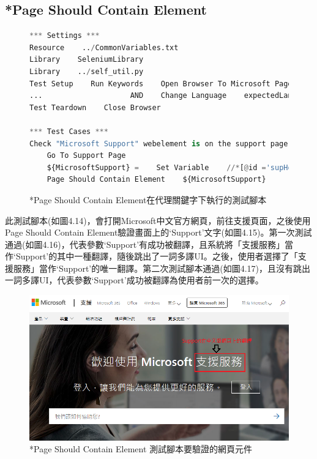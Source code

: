 \subsection{*Page Should Contain Element}
\begin{figure}[H]
\begin{lstlisting}[language={python}]
*** Settings ***
Resource    ../CommonVariables.txt
Library    SeleniumLibrary
Library    ../self_util.py
Test Setup    Run Keywords    Open Browser To Microsoft Page
...                    AND    Change Language    expectedLanguage=${language}
Test Teardown    Close Browser

*** Test Cases ***
Check "Microsoft Support" webelement is on the support page
    Go To Support Page
    ${MicrosoftSupport} =    Set Variable    //*[@id ='supHomeAndLandingPageHeaderContainer']//*[contains(text(), 'Support')]
    Page Should Contain Element    ${MicrosoftSupport}
\end{lstlisting}
\caption{*Page Should Contain Element在代理關鍵字下執行的測試腳本}
\end{figure}
此測試腳本(如圖4.14)，會打開Microsoft中文官方網頁，前往支援頁面，之後使用Page Should Contain Element驗證畫面上的‘Support’文字(如圖4.15)。第一次測試通過(如圖4.16)，代表參數‘Support’有成功被翻譯，且系統將「支援服務」當作‘Support’的其中一種翻譯，隨後跳出了一詞多譯UI。之後，使用者選擇了「支援服務」當作‘Support’的唯一翻譯。第二次測試腳本通過(如圖4.17)，且沒有跳出一詞多譯UI，代表參數‘Support’成功被翻譯為使用者前一次的選擇。

\begin{figure}[H]
\centering
\includegraphics[width= .8\textwidth]{../論文截圖/4-1-9 Page should contain element要驗證的網頁元件.png}
\caption{*Page Should Contain Element 測試腳本要驗證的網頁元件\cite{microsoft}}
\end{figure}

